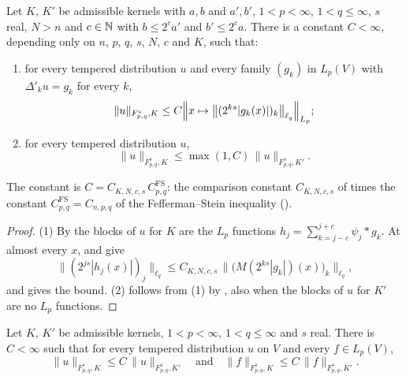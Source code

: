 \begin{lemma}
\label{lem:lp-kernel-comparison-blocks}
\leanok
{}
Let $K$, $K'$ be admissible kernels with $a, b$ and $a', b'$, $1 < p < \infty$,
$1 < q \leq \infty$, $s$ real, $N > n$ and $c \in \mathbb{N}$ with $b \leq 2^c a'$ and $b' \leq 2^c a$.
There is a constant $C < \infty$, depending only on $n$, $p$, $q$, $s$, $N$, $c$ and $K$, such
that:
\begin{enumerate}
  \item for every tempered distribution $u$ and every family $(g_k)$ in $L_p(V)$ with
    $\Delta'_k u = g_k$ for every $k$,
    \[
      \|u\|_{F^s_{p,q}, K} \leq C
      \Bigl\| x \mapsto \bigl\| (2^{ks} |g_k(x)|)_k \bigr\|_{\ell_q} \Bigr\|_{L_p} ;
    \]
  \item for every tempered distribution $u$,
    \[
      \|u\|_{F^s_{p,q}, K} \leq \max(1, C) \, \|u\|_{F^s_{p,q}, K'} .
    \]
\end{enumerate}
\end{lemma}

The constant is $C = C_{K,N,c,s} \, C^{\mathrm{FS}}_{p,q}$: the comparison constant
$C_{K,N,c,s}$ of  times the constant
$C^{\mathrm{FS}}_{p,q} = C_{n,p,q}$ of the Fefferman--Stein inequality
().

\begin{proof}
\leanok
(1) By  the blocks of $u$ for $K$ are the $L_p$ functions
$h_j = \sum_{k = j - c}^{j + c} \psi_j * g_k$. At almost every $x$, 
and  give
\[
  \bigl\| (2^{js} |h_j(x)|)_j \bigr\|_{\ell_q}
  \leq C_{K,N,c,s} \, \bigl\| \bigl(M(2^{ks} |g_k|)(x)\bigr)_k \bigr\|_{\ell_q} ,
\]
and  gives the bound. (2) follows from (1) by
, also when the blocks of $u$ for $K'$ are no $L_p$ functions.
\end{proof}

\begin{theorem}
\label{thm:lp-family-independence}
\leanok
{}
Let $K$, $K'$ be admissible kernels, $1 < p < \infty$, $1 < q \leq \infty$ and $s$ real. There is
$C < \infty$ such that for every tempered distribution $u$ on $V$ and every $f \in L_p(V)$,
\[
  \|u\|_{F^s_{p,q}, K} \leq C \, \|u\|_{F^s_{p,q}, K'}
  \quad \text{and} \quad
  \|f\|_{F^s_{p,q}, K} \leq C \, \|f\|_{F^s_{p,q}, K'} .
\]
\end{theorem}

